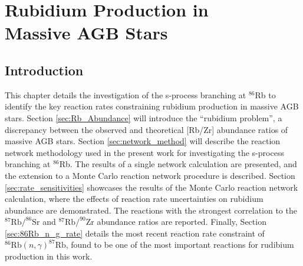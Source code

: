 \chapter[Rubidium Production in Massive AGB Stars]{\textbf{Rubidium Production in \\ Massive AGB Stars}}
\label{ch:Rb}



\section{Introduction}


This chapter details the investigation of the s-process branching at $^{86}$Rb to identify the key reaction rates constraining rubidium production in massive AGB stars. Section \ref{sec:Rb_Abundance} will introduce the ``rubidium problem'', a discrepancy between the observed and theoretical [Rb/Zr] abundance ratios of massive AGB stars. Section \ref{sec:network_method} will describe the reaction network methodology used in the present work for investigating the s-process branching at $^{86}$Rb. The results of a single network calculation are presented, and the extension to a Monte Carlo reaction network procedure is described. Section \ref{sec:rate_sensitivities} showcases the results of the Monte Carlo reaction network calculation, where the effects of reaction rate uncertainties on rubidium abundance are demonstrated. The reactions with the strongest correlation to the $^{87}\mathrm{Rb}/^{86}\mathrm{Sr}$ and $^{87}\mathrm{Rb}/^{90}\mathrm{Zr}$ abundance ratios are reported. Finally, Section \ref{sec:86Rb_n_g_rate} details the most recent reaction rate constraint of $^{86}\mathrm{Rb}(n,\gamma)^{87}\mathrm{Rb}$, found to be one of the most important reactions for rudibium production in this work.

